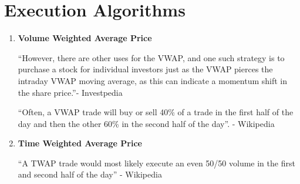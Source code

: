 \documentclass{report}
\begin{document}
\section{Execution Algorithms}
\begin{enumerate}
\item {\bf Volume Weighted Average Price}

  ``However, there are other uses for the VWAP, and one such strategy is to purchase a stock for individual investors just as the VWAP pierces the intraday VWAP moving average, as this can indicate a momentum shift in the share price.''- Investpedia

  ``Often, a VWAP trade will buy or sell 40\% of a trade in the first half of the day and then the other 60\% in the second half of the day''.    - Wikipedia
  
\item{\bf Time Weighted Average Price}

``A TWAP trade would most likely execute an even 50/50 volume in the first and second half of the day'' - Wikipedia

  
\end{enumerate}






\end{document}
